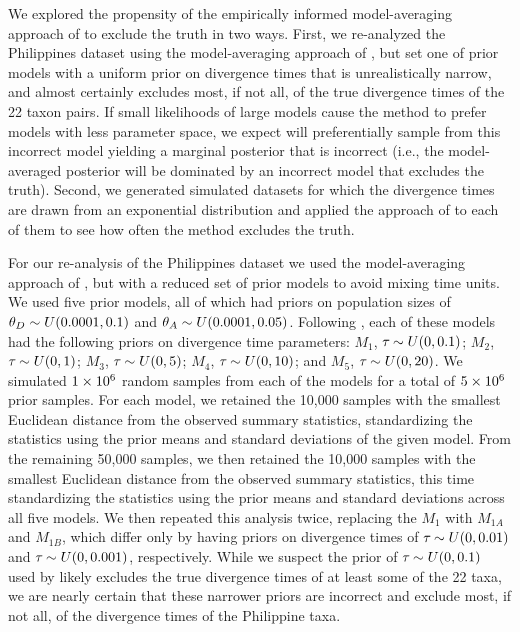 \documentclass[letterpaper,12pt]{article}
\begin{document}
\begin{linenumbers}
We explored the propensity of the empirically informed model-averaging approach
of \citet{Hickerson2013} to exclude the truth in two ways.
First, we re-analyzed the Philippines dataset using the model-averaging approach
of \citet{Hickerson2013}, but set one of prior models with a uniform prior on
divergence times that is unrealistically narrow, and almost certainly excludes
most, if not all, of the true divergence times of the 22 taxon pairs.
If small likelihoods of large models cause the method to prefer models with
less parameter space, we expect \msb will preferentially sample from this
incorrect model yielding a marginal posterior that is incorrect (i.e., the
model-averaged posterior will be dominated by an incorrect model that excludes
the truth).
Second, we generated simulated datasets for which the divergence times are
drawn from an exponential distribution and applied the approach of
\citet{Hickerson2013} to each of them to see how often the method excludes the
truth.

For our re-analysis of the Philippines dataset we used the model-averaging
approach of \citet{Hickerson2013}, but with a reduced set of prior models to
avoid mixing time units.
We used five prior models, all of which had priors on population sizes of
$\meanDescendantTheta{} \sim U(0.0001, 0.1)$ and $\ancestralTheta{} \sim
U(0.0001, 0.05)$.
Following \citet{Hickerson2013}, each of these models had the following
priors on divergence time parameters:
$M_1$, $\tau_{} \sim U(0, 0.1)$;
$M_2$, $\tau_{} \sim U(0, 1)$;
$M_3$, $\tau_{} \sim U(0, 5)$;
$M_4$, $\tau_{} \sim U(0, 10)$; and
$M_5$, $\tau_{} \sim U(0, 20)$.
We simulated $1\times 10^{6}$ random samples from each of the models for a total of
$5\times 10^{6}$ prior samples.
For each model, we retained the 10,000 samples with the smallest Euclidean
distance from the observed summary statistics, standardizing the statistics
using the prior means and standard deviations of the given model.
From the remaining 50,000 samples, we then retained the 10,000 samples with the
smallest Euclidean distance from the observed summary statistics, this time
standardizing the statistics using the prior means and standard deviations
across all five models.
We then repeated this analysis twice, replacing the $M_1$ with
$M_{1A}$ and $M_{1B}$, which differ only by having priors on divergence
times of $\tau_{} \sim U(0, 0.01)$ and $\tau_{} \sim U(0, 0.001)$,
respectively.
While we suspect the prior of $\tau_{} \sim U(0, 0.1)$ used by
\citet{Hickerson2013} likely excludes the true divergence times of at least
some of the 22 taxa, we are nearly certain that these narrower priors are
incorrect and exclude most, if not all, of the divergence times of the
Philippine taxa.


\end{linenumbers}
\end{document}
